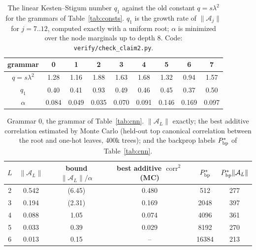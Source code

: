 \documentclass[11pt]{article}
\theoremstyle{definition}
\newcommand{\norm}[1]{\lVert #1\rVert}
\begin{document}
\begin{table}[h]\centering
\caption{The linear Kesten--Stigum number $q_1$ against the old constant $q=s\lambda^2$ for the
grammars of Table~\ref{tab:consts}. $q_1$ is the growth rate of $\norm{\mathcal A_j}$ for $j=7..12$,
computed exactly with a uniform root; $\alpha$ is minimized over the node marginals up to depth $8$.
Code: \texttt{verify/check\_claim2.py}.}\label{tab:q1}
\small\begin{tabular}{ccccccccc}\toprule grammar & 0 & 1 & 2 & 3 & 4 & 5 & 6 & 7\\\midrule
$q=s\lambda^2$ & 1.28 & 1.16 & 1.88 & 1.63 & 1.68 & 1.32 & 0.94 & 1.57\\
$q_1$ & 0.40 & 0.41 & 0.93 & 0.49 & 0.46 & 0.45 & 0.37 & 0.50\\
$\alpha$ & 0.084 & 0.049 & 0.035 & 0.070 & 0.091 & 0.146 & 0.169 & 0.097\\
\bottomrule\end{tabular}
\end{table}

\begin{table}[h]\centering
\caption{Grammar 0, the grammar of Table~\ref{tab:cnn}. $\norm{\mathcal A_L}$ exactly; the best additive
correlation estimated by Monte Carlo (held-out top canonical correlation between the root and one-hot
leaves, 400k trees); and the backprop labels $P^*_{\rm bp}$ of Table~\ref{tab:cnn}.}\label{tab:q1check}
\small\begin{tabular}{cccccc}\toprule
$L$ & $\norm{\mathcal A_L}$ & bound $\norm{\mathcal A_L}/\alpha$ & best additive $\operatorname{corr}^2$ (MC) &
$P^*_{\rm bp}$ & $P^*_{\rm bp}\norm{\mathcal A_L}$\\\midrule
2 & 0.542 & (6.45) & 0.480 & 512 & 277\\
3 & 0.194 & (2.31) & 0.169 & 2048 & 397\\
4 & 0.088 & 1.05\phantom{)} & 0.074 & 4096 & 361\\
5 & 0.033 & 0.39\phantom{)} & 0.029 & 8192 & 270\\
6 & 0.013 & 0.15\phantom{)} & -- & 16384 & 213\\
\bottomrule\end{tabular}
\end{table}
\end{document}

